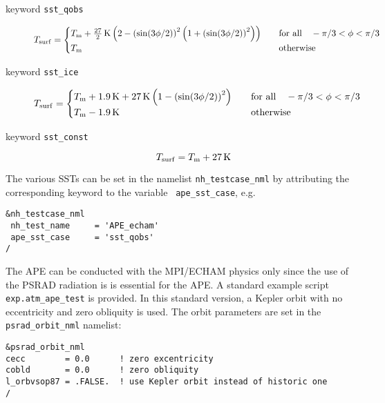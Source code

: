 \begin{description}
\item[keyword {\tt sst\_qobs}]
\begin{equation}
T_{\rm surf}=
\begin{cases}
T_{\rm m} + \frac{27}{2}\,{\rm K} \left(2-\left(\sin(3\phi/2)\right)^2
\left(1+\left(\sin(3\phi/2)\right)^2
\right)\right)
&\quad \text{for all} \quad -\pi/3<\phi<\pi/3\\
T_{\rm m} &\quad \text{otherwise}
\end{cases}
\end{equation}
\item[keyword {\tt sst\_ice}]
\begin{equation}
T_{\rm surf}=
\begin{cases}
T_{\rm m} + 1.9\,{\rm K} + 27\,{\rm K} \left(1-\left(\sin(3\phi/2)\right)^2\right)
&\quad \text{for all} \quad -\pi/3<\phi<\pi/3\\
T_{\rm m}-1.9\,{\rm K} &\quad \text{otherwise}
\end{cases}
\end{equation}
\item[keyword {\tt sst\_const}]
\begin{equation}
T_{\rm surf}=T_{\rm m}+27\,{\rm K}
\end{equation}
 
\end{description}

The various SSTs can be set in the namelist {\tt nh\_testcase\_nml} by
attributing the corresponding keyword to the variable {\tt
  ape\_sst\_case}, e.g.

\begin{lstlisting}[caption=Testcase namelist for APE ({\tt
    exp.atm\_ape\_test}), label=cr20160216_testcasenml]
&nh_testcase_nml
 nh_test_name     = 'APE_echam'
 ape_sst_case     = 'sst_qobs'
/
\end{lstlisting}

The
APE can be conducted with the MPI/ECHAM physics only since 
the use of the PSRAD radiation is is essential for the APE. A standard
example script {\tt exp.atm\_ape\_test} is provided.
In this standard version, a Kepler orbit with no eccentricity and
zero obliquity is used. The orbit parameters are set in the {\tt
  psrad\_orbit\_nml} namelist:

\begin{lstlisting}[caption=Orbit namelist for APE ({\tt exp.atm\_ape\_test}),
label=cr20160216_orbitnml]
&psrad_orbit_nml
cecc        = 0.0      ! zero excentricity
cobld       = 0.0      ! zero obliquity
l_orbvsop87 = .FALSE.  ! use Kepler orbit instead of historic one
/
\end{lstlisting}

